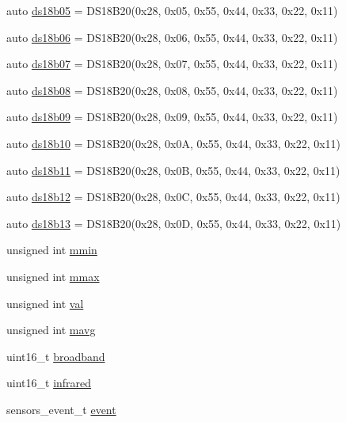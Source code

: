 \begin{DoxyCompactItemize}
\item 
auto \hyperlink{OWH__DS18B20__asInterface__SensorStation_8ino_a44eb0a39bccb1bb14d914abc4506d1a4}{ds18b05} = D\-S18\-B20(0x28, 0x05, 0x55, 0x44, 0x33, 0x22, 0x11)
\item 
auto \hyperlink{OWH__DS18B20__asInterface__SensorStation_8ino_adb13165d97b4ac8b92f6e3e3b378a978}{ds18b06} = D\-S18\-B20(0x28, 0x06, 0x55, 0x44, 0x33, 0x22, 0x11)
\item 
auto \hyperlink{OWH__DS18B20__asInterface__SensorStation_8ino_a5183668bddd46e2134664d247363bc7f}{ds18b07} = D\-S18\-B20(0x28, 0x07, 0x55, 0x44, 0x33, 0x22, 0x11)
\item 
auto \hyperlink{OWH__DS18B20__asInterface__SensorStation_8ino_acf7bab2936aad16c635e88c442ad69a5}{ds18b08} = D\-S18\-B20(0x28, 0x08, 0x55, 0x44, 0x33, 0x22, 0x11)
\item 
auto \hyperlink{OWH__DS18B20__asInterface__SensorStation_8ino_aa80e6e3970b59c46fd137aa82d649db8}{ds18b09} = D\-S18\-B20(0x28, 0x09, 0x55, 0x44, 0x33, 0x22, 0x11)
\item 
auto \hyperlink{OWH__DS18B20__asInterface__SensorStation_8ino_a59751c07640446f3a0a31507023ef32a}{ds18b10} = D\-S18\-B20(0x28, 0x0\-A, 0x55, 0x44, 0x33, 0x22, 0x11)
\item 
auto \hyperlink{OWH__DS18B20__asInterface__SensorStation_8ino_afe1f79b15300673319f9295c3ef94f47}{ds18b11} = D\-S18\-B20(0x28, 0x0\-B, 0x55, 0x44, 0x33, 0x22, 0x11)
\item 
auto \hyperlink{OWH__DS18B20__asInterface__SensorStation_8ino_aafe9ba7a96bf47afc486d09b9897fe60}{ds18b12} = D\-S18\-B20(0x28, 0x0\-C, 0x55, 0x44, 0x33, 0x22, 0x11)
\item 
auto \hyperlink{OWH__DS18B20__asInterface__SensorStation_8ino_a6eda42d9db98a8b5e5d09256d75039d9}{ds18b13} = D\-S18\-B20(0x28, 0x0\-D, 0x55, 0x44, 0x33, 0x22, 0x11)
\item 
unsigned int \hyperlink{OWH__DS18B20__asInterface__SensorStation_8ino_a46d2773d075382821ba5cc9724036ef6}{mmin}
\item 
unsigned int \hyperlink{OWH__DS18B20__asInterface__SensorStation_8ino_ac3c625f389082ca7f017934b3508462d}{mmax}
\item 
unsigned int \hyperlink{OWH__DS18B20__asInterface__SensorStation_8ino_a9163138d612480a614fa98c44e4318c4}{val}
\item 
unsigned int \hyperlink{OWH__DS18B20__asInterface__SensorStation_8ino_ad54903c3e759902a4089ee088aedb4a6}{mavg}
\item 
uint16\-\_\-t \hyperlink{OWH__DS18B20__asInterface__SensorStation_8ino_aaa5c7d0bf3e3db372c321ee38a514a57}{broadband}
\item 
uint16\-\_\-t \hyperlink{OWH__DS18B20__asInterface__SensorStation_8ino_a5677d0b4405dd192091db97a8941dbc8}{infrared}
\item 
sensors\-\_\-event\-\_\-t \hyperlink{OWH__DS18B20__asInterface__SensorStation_8ino_a40ecda65c4ebce49fa139666f210bef0}{event}
\end{DoxyCompactItemize}


